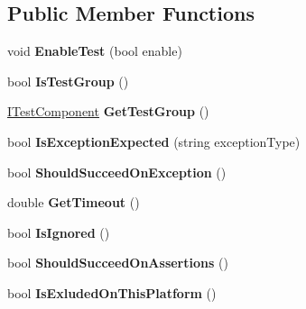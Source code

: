 \subsection*{Public Member Functions}
\begin{DoxyCompactItemize}
\item 
\mbox{\label{interface_unity_test_1_1_i_test_component_abe2c9cca8555318032d0b96709198ab4}} 
void {\bfseries Enable\+Test} (bool enable)
\item 
\mbox{\label{interface_unity_test_1_1_i_test_component_ad837f10988510012bfaf713b4b5367a2}} 
bool {\bfseries Is\+Test\+Group} ()
\item 
\mbox{\label{interface_unity_test_1_1_i_test_component_acc70a69a6e3dc94a3178a28fd0929536}} 
\hyperlink{interface_unity_test_1_1_i_test_component}{I\+Test\+Component} {\bfseries Get\+Test\+Group} ()
\item 
\mbox{\label{interface_unity_test_1_1_i_test_component_aa8452facb4c055ca7770e6255e1ba23b}} 
bool {\bfseries Is\+Exception\+Expected} (string exception\+Type)
\item 
\mbox{\label{interface_unity_test_1_1_i_test_component_ae8ee65bdf91327b3148c6b34cd28377b}} 
bool {\bfseries Should\+Succeed\+On\+Exception} ()
\item 
\mbox{\label{interface_unity_test_1_1_i_test_component_ac81b80c87be7c4d3bba9fcb40929370a}} 
double {\bfseries Get\+Timeout} ()
\item 
\mbox{\label{interface_unity_test_1_1_i_test_component_a0730e372000e64f72cb1d3120232a52e}} 
bool {\bfseries Is\+Ignored} ()
\item 
\mbox{\label{interface_unity_test_1_1_i_test_component_a9f1a5f85a1395b1de1ffbb3a06da00a7}} 
bool {\bfseries Should\+Succeed\+On\+Assertions} ()
\item 
\mbox{\label{interface_unity_test_1_1_i_test_component_ad68ed9402a979b16f32c5dfe3848cfc9}} 
bool {\bfseries Is\+Exluded\+On\+This\+Platform} ()
\end{DoxyCompactItemize}
